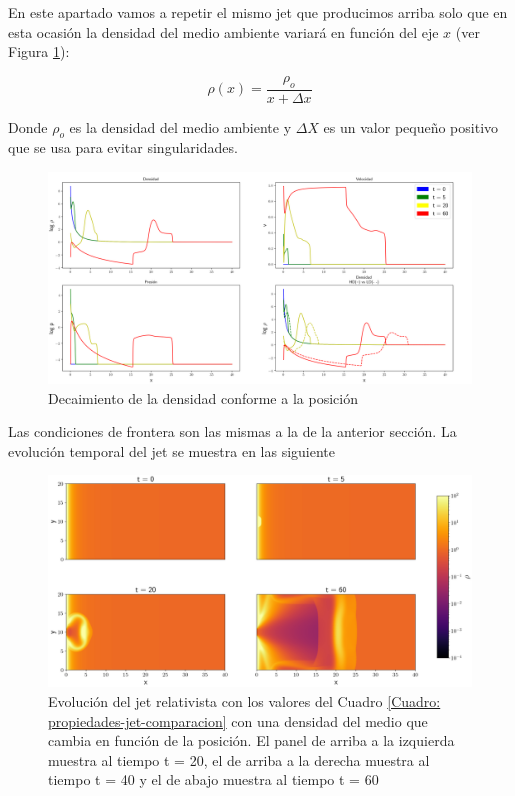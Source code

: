 \documentclass[12pt,a4paper]{book}
\begin{document}
{\color {red} En este apartado vamos a repetir el mismo jet que producimos arriba solo que en esta ocasión la densidad
del medio ambiente variará en función del eje $x$ (ver Figura \ref{fig:Decaimiento_densidad_jet}):

\begin{equation}
  \rho(x) = \frac{\rho_o}{x+\Delta x} 
\end{equation}

Donde $\rho_o$ es la densidad del medio ambiente y $\Delta X$ es un valor pequeño positivo que se usa para evitar singularidades.


\begin{figure}
  \centering
    \includegraphics[width=1\textwidth]{./Figuras/jet/densidad_variable/perfiles.png}
  \caption{Decaimiento de la densidad conforme a la posición}\label{fig:Decaimiento_densidad_jet}
\end{figure}


Las condiciones de frontera son las mismas a la de la anterior sección. La evolución temporal del jet se muestra en las siguiente 



\begin{figure}
  \centering
    \includegraphics[width=1\textwidth]{./Figuras/jet/densidad_variable/evolucion_HD.png}
    \caption{Evolución del jet relativista con los valores del Cuadro 
    \ref{Cuadro: propiedades-jet-comparacion} con una densidad del medio que cambia en función de 
    la posición. El panel de arriba a la izquierda muestra al 
    tiempo t = 20, el de arriba a la derecha muestra al tiempo t = 40
    y el de abajo muestra al tiempo t = 60 }\label{fig:evolucion_temporal_del_jet_densidad_variable}
\end{figure}

}
\end{document}
